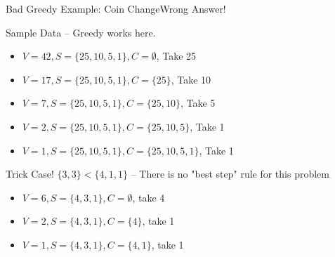 \begin{frame}{Bad Greedy Example: Coin Change}{Wrong Answer!}
  \begin{block}{Sample Data -- Greedy works here.}
    \begin{itemize}
      \item $V = 42, S = \{ 25, 10, 5, 1\}, C = \emptyset$, Take 25
      \item $V = 17, S = \{ 25, 10, 5, 1\}, C = \{25\}$, Take 10
      \item $V = 7, S = \{ 25, 10, 5, 1\}, C = \{25, 10\}$, Take 5
      \item $V = 2, S = \{ 25, 10, 5, 1\}, C = \{25, 10, 5\}$, Take 1
      \item $V = 1, S = \{ 25, 10, 5, 1\}, C = \{25, 10, 5, 1\}$, Take 1
    \end{itemize}
  \end{block}

  \begin{alertblock}{Trick Case! $\{3, 3\} < \{4, 1, 1\}$ -- There is no "best step" rule for this problem}
    \begin{itemize}
      \item $V = 6, S = \{4,3,1\}, C = \emptyset$, take 4
      \item $V = 2, S = \{4,3,1\}, C = \{4\}$, take 1
      \item $V = 1, S = \{4,3,1\}, C = \{4,1\}$, take 1
    \end{itemize}
  \end{alertblock}
\end{frame}
